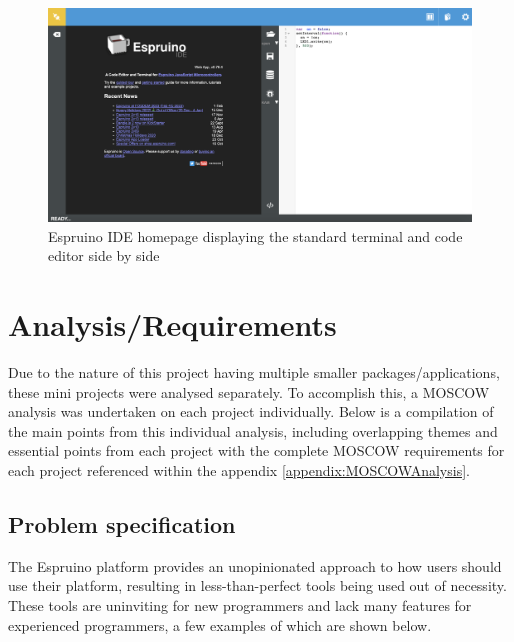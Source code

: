 \documentclass{l4proj}
\begin{document}
\begin{figure}[!ht]
    \centering
    \includegraphics[width=12cm]{dissertation/images/espruino-ide.png}
    \caption{Espruino IDE homepage displaying the standard terminal and code editor side by side}
    \label{fig:espruino-ide}
\end{figure}

\chapter{Analysis/Requirements}

\text Due to the nature of this project having multiple smaller packages/applications, these mini projects were analysed separately. To accomplish this, a MOSCOW analysis was undertaken on each project individually. Below is a compilation of the main points from this individual analysis, including overlapping themes and essential points from each project with the complete MOSCOW requirements for each project referenced within the appendix \ref{appendix:MOSCOWAnalysis}.

\section{Problem specification}
The Espruino platform provides an unopinionated approach to how users should use their platform, resulting in less-than-perfect tools being used out of necessity. These tools are uninviting for new programmers and lack many features for experienced programmers, a few examples of which are shown below.
\end{document}
